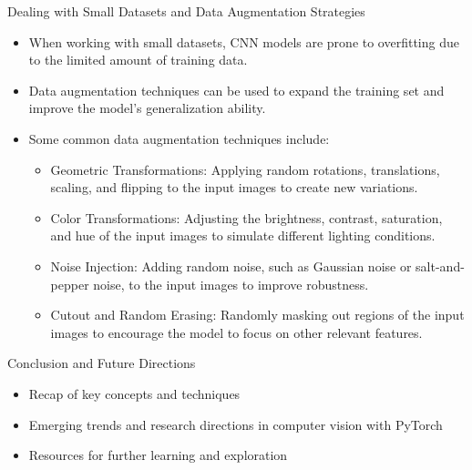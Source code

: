 \documentclass{beamer}
\begin{document}
\begin{frame}{Dealing with Small Datasets and Data Augmentation Strategies}
\begin{itemize}
    \item When working with small datasets, CNN models are prone to overfitting due to the limited amount of training data.
    \item Data augmentation techniques can be used to expand the training set and improve the model's generalization ability.
    \item Some common data augmentation techniques include:
        \begin{itemize}
            \item Geometric Transformations: Applying random rotations, translations, scaling, and flipping to the input images to create new variations.
            \item Color Transformations: Adjusting the brightness, contrast, saturation, and hue of the input images to simulate different lighting conditions.
            \item Noise Injection: Adding random noise, such as Gaussian noise or salt-and-pepper noise, to the input images to improve robustness.
            \item Cutout and Random Erasing: Randomly masking out regions of the input images to encourage the model to focus on other relevant features.
        \end{itemize}
\end{itemize}
\end{frame}

\begin{frame}{Conclusion and Future Directions}
\begin{itemize}
    \item Recap of key concepts and techniques
    \item Emerging trends and research directions in computer vision with PyTorch
    \item Resources for further learning and exploration
\end{itemize}
\end{frame}
\end{document}
